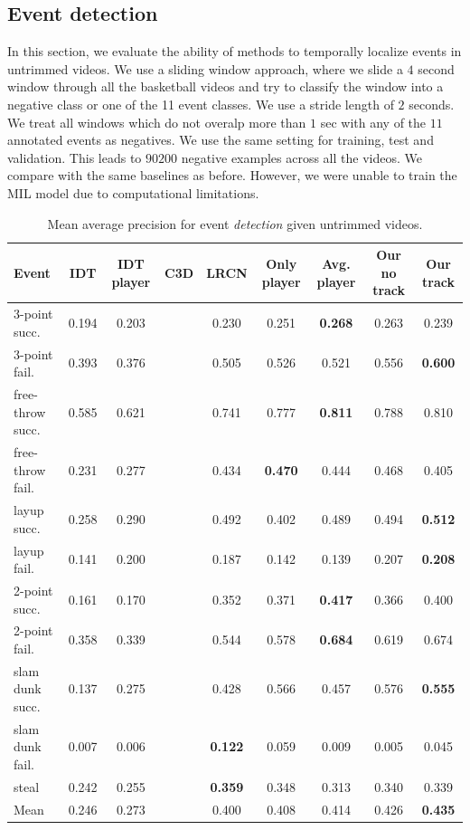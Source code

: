 \subsection{Event detection}

In this section, we evaluate the ability of methods to temporally localize
events in untrimmed videos.  We use a sliding window approach, where we slide a
$4$ second window through all the basketball videos and try to classify the
window into a negative class or one of the 11 event classes. We use a stride
length of $2$ seconds.  We treat all windows which do not overalp more than $1$
sec with any of the $11$ annotated events as negatives. We use the same setting
for training, test and validation.  This leads to $90200$ negative examples
across all the videos.  We compare with the same baselines as before. However,
we were unable to train the MIL model due to computational limitations.

\begin{table}[ht!]
\begin{center}
\small
 \begin{tabular}{|l|c|c|c|c|c|c|c|c|}
  \hline
Event & IDT\cite{Wang_CVPR11} & IDT player\cite{Wang_CVPR11} & C3D \cite{Tran_arxiv14} & LRCN \cite{Donahue_arxiv14} & Only player & Avg. player & Our no track & Our track \\ \hline \hline
3-point succ.    & 0.194  & 0.203 &  & 0.230 & 0.251 & \textbf{0.268} & 0.263 & 0.239 \\
3-point fail.    & 0.393  & 0.376 &  & 0.505 & 0.526 & 0.521 & 0.556 & \textbf{0.600} \\
free-throw succ. & 0.585  & 0.621 &  & 0.741 & 0.777 & \textbf{0.811} & 0.788 & 0.810 \\
free-throw fail. & 0.231  & 0.277 &  & 0.434 & \textbf{0.470} & 0.444 & 0.468 & 0.405 \\
layup succ.      & 0.258  & 0.290 &  & 0.492 & 0.402 & 0.489 & 0.494 & \textbf{0.512} \\
layup fail.      & 0.141  & 0.200 &  & 0.187 & 0.142 & 0.139 & 0.207 & \textbf{0.208} \\
2-point succ.    & 0.161  & 0.170 &  & 0.352 & 0.371 & \textbf{0.417} & 0.366 & 0.400 \\
2-point fail.    & 0.358  & 0.339 &  & 0.544 & 0.578 & \textbf{0.684} & 0.619 & 0.674 \\
  slam dunk succ.& 0.137  & 0.275 &  & 0.428 & 0.566 & 0.457 & 0.576 & \textbf{0.555} \\
slam dunk fail.  & 0.007  & 0.006 &  & \textbf{0.122} & 0.059 & 0.009 & 0.005 & 0.045 \\
steal            & 0.242  & 0.255 &  & \textbf{0.359} & 0.348 & 0.313 & 0.340 & 0.339 \\ \hline \hline
Mean             & 0.246  & 0.273 &  & 0.400 & 0.408 & 0.414 & 0.426 & \textbf{0.435} \\ \hline
  \end{tabular}
\end{center}
  \caption{Mean average precision for event {\em detection} given
    untrimmed videos.}
  \label{tab:detection_res}
\end{table}

